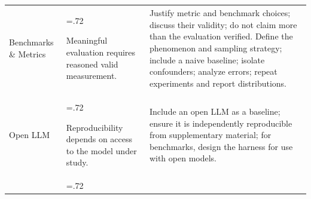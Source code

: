 \documentclass[smallextended]{svjour3}
\newcommand{\must}{\textbf{must}\xspace}
\newcommand{\should}{\textbf{should}\xspace}
\newcommand{\paper}{\emph{paper}\xspace}
\newcommand{\supplementarymaterial}{\emph{supplementary material}\xspace}
\newcommand{\paper}{\emph{paper}\xspace}
\newcommand{\supplementarymaterial}{\emph{supplementary material}\xspace}
\newcommand{\iconM}{\usebox{\iconMbox}\xspace}
\newcommand{\iconS}{\usebox{\iconSbox}\xspace}
\newcommand{\iconM}{●\xspace}
\newcommand{\iconS}{○\xspace}
\newcommand{\annotators}{\hyperref[sec:llms-as-annotators]{\mbox{\emph{LLMs as Annotators}}}\xspace}
\newcommand{\judges}{\hyperref[sec:llms-as-judges]{\mbox{\emph{LLMs as Judges}}}\xspace}
\newcommand{\synthesis}{\hyperref[sec:llms-for-synthesis]{\mbox{\emph{LLMs for Synthesis}}}\xspace}
\newcommand{\subjects}{\hyperref[sec:llms-as-subjects]{\mbox{\emph{LLMs as Subjects}}}\xspace}
\newcommand{\benchmarkingtasks}{\hyperref[sec:benchmarking-llms-for-software-engineering-tasks]{\mbox{\emph{Benchmarking LLMs}}}\xspace}
\newcommand{\annotators}{\href{/study-types/annotators/}{\emph{LLMs as Annotators}}\xspace}
\newcommand{\judges}{\href{/study-types/judges/}{\emph{LLMs as Judges}}\xspace}
\newcommand{\synthesis}{\href{/study-types/synthesis/}{\emph{LLMs for Synthesis}}\xspace}
\newcommand{\subjects}{\href{/study-types/subjects/}{\emph{LLMs as Subjects}}\xspace}
\newcommand{\benchmarkingtasks}{\href{/study-types/benchmarking/}{\emph{Benchmarking LLMs}}\xspace}
\begin{document}
\begin{appendices}
\begin{center}
\begin{tabularx}{\textwidth}{@{}>{\raggedright\arraybackslash}p{2.05cm}>{\hsize=.72\hsize\raggedright\arraybackslash}X>{\hsize=1.28\hsize\raggedright\arraybackslash}X@{}}
Benchmarks \& Metrics & Meaningful evaluation requires reasoned valid measurement. &
\iconM Justify metric and benchmark choices; discuss their validity; do not claim more than the evaluation verified.
\newline \iconS Define the phenomenon and sampling strategy; include a naive baseline; isolate confounders; analyze errors; repeat experiments and report distributions. \\
\addlinespace
Open LLM & Reproducibility depends on access to the model under study. &
\iconS Include an open LLM as a baseline; ensure it is independently reproducible from supplementary material; for benchmarks, design the harness for use with open models. \\
\addlinespace

\end{tabularx}
\end{center}
\end{appendices}
\end{document}
